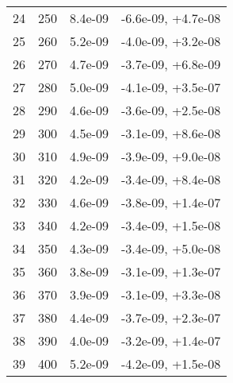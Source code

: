 \begin{table}
\begin{adjustbox}{width=1\textwidth/2}
\begin{tabular}{|c|c|c|c|}
\cline{1-4}
24 & 250 & 8.4e-09 & -6.6e-09, +4.7e-08 \\
\cline{1-4}
25 & 260 & 5.2e-09 & -4.0e-09, +3.2e-08 \\
\cline{1-4}
26 & 270 & 4.7e-09 & -3.7e-09, +6.8e-09 \\
\cline{1-4}
27 & 280 & 5.0e-09 & -4.1e-09, +3.5e-07 \\
\cline{1-4}
28 & 290 & 4.6e-09 & -3.6e-09, +2.5e-08 \\
\cline{1-4}
29 & 300 & 4.5e-09 & -3.1e-09, +8.6e-08 \\
\cline{1-4}
30 & 310 & 4.9e-09 & -3.9e-09, +9.0e-08 \\
\cline{1-4}
31 & 320 & 4.2e-09 & -3.4e-09, +8.4e-08 \\
\cline{1-4}
32 & 330 & 4.6e-09 & -3.8e-09, +1.4e-07 \\
\cline{1-4}
33 & 340 & 4.2e-09 & -3.4e-09, +1.5e-08 \\
\cline{1-4}
34 & 350 & 4.3e-09 & -3.4e-09, +5.0e-08 \\
\cline{1-4}
35 & 360 & 3.8e-09 & -3.1e-09, +1.3e-07 \\
\cline{1-4}
36 & 370 & 3.9e-09 & -3.1e-09, +3.3e-08 \\
\cline{1-4}
37 & 380 & 4.4e-09 & -3.7e-09, +2.3e-07 \\
\cline{1-4}
38 & 390 & 4.0e-09 & -3.2e-09, +1.4e-07 \\
\cline{1-4}
39 & 400 & 5.2e-09 & -4.2e-09, +1.5e-08 \\
\cline{1-4}
\end{tabular}
\end{adjustbox}
\end{table}

